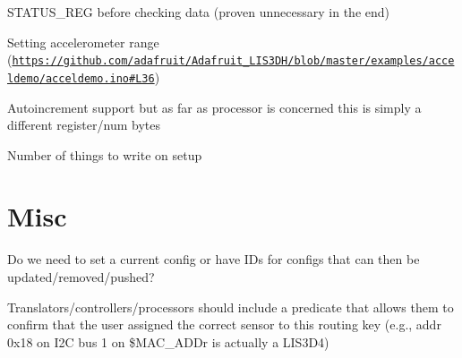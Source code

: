 
\begin{DoxyItemize}
\item {\ttfamily S\+T\+A\+T\+U\+S\+\_\+\+R\+EG} before checking data (proven unnecessary in the end)
\item Setting accelerometer range (\href{https://github.com/adafruit/Adafruit_LIS3DH/blob/master/examples/acceldemo/acceldemo.ino#L36}{\tt https\+://github.\+com/adafruit/\+Adafruit\+\_\+\+L\+I\+S3\+D\+H/blob/master/examples/acceldemo/acceldemo.\+ino\#\+L36})
\item Autoincrement support but as far as processor is concerned this is simply a different register/num bytes
\item Number of things to write on setup
\end{DoxyItemize}

\section*{Misc}


\begin{DoxyItemize}
\item Do we need to set a current config or have I\+Ds for configs that can then be updated/removed/pushed?
\item Translators/controllers/processors should include a predicate that allows them to confirm that the user assigned the correct sensor to this routing key (e.\+g., addr 0x18 on I2C bus 1 on \$\+M\+A\+C\+\_\+\+A\+D\+Dr is actually a L\+I\+S3\+D4) 
\end{DoxyItemize}
